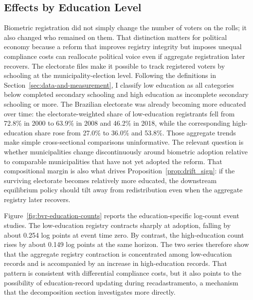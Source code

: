 \subsection{Effects by Education Level}
\label{sec:electorate-composition}
\label{ssec:bvr-education-levels}

Biometric registration did not simply change the number of voters on the rolls; it also changed who remained on them. That distinction matters for political economy because a reform that improves registry integrity but imposes unequal compliance costs can reallocate political voice even if aggregate registration later recovers. The \TSE{} electorate files make it possible to track registered voters by schooling at the municipality-election level. Following the definitions in Section~\ref{sec:data-and-measurement}, I classify low education as all categories below completed secondary schooling and high education as incomplete secondary schooling or more. The Brazilian electorate was already becoming more educated over time: the electorate-weighted share of low-education registrants fell from 72.8\% in 2000 to 63.9\% in 2008 and 46.2\% in 2018, while the corresponding high-education share rose from 27.0\% to 36.0\% and 53.8\%. Those aggregate trends make simple cross-sectional comparisons uninformative. The relevant question is whether municipalities change discontinuously around biometric adoption relative to comparable municipalities that have not yet adopted the reform. That compositional margin is also what drives Proposition~\ref{prop:drift_sign}: if the surviving electorate becomes relatively more educated, the downstream equilibrium policy should tilt away from redistribution even when the aggregate registry later recovers.

Figure~\ref{fig:bvr-education-counts} reports the education-specific log-count event studies. The low-education registry contracts sharply at adoption, falling by about 0.254 log points at event time zero. By contrast, the high-education count rises by about 0.149 log points at the same horizon. The two series therefore show that the aggregate registry contraction is concentrated among low-education records and is accompanied by an increase in high-education records. That pattern is consistent with differential compliance costs, but it also points to the possibility of education-record updating during recadastramento, a mechanism that the decomposition section investigates more directly.

